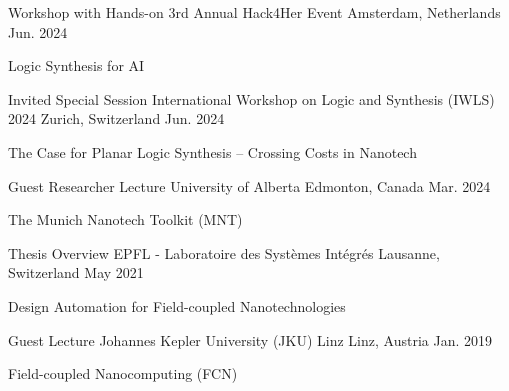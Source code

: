 \begin{cventries}
  \cventry
    {Workshop with Hands-on} %
    {3rd Annual Hack4Her Event} %
    {Amsterdam, Netherlands} %
    {Jun. 2024} %
    {
      \begin{cvitems} %
        \item {Logic Synthesis for AI}
      \end{cvitems}
    }

  \cventry
    {Invited Special Session} %
    {International Workshop on Logic and Synthesis (IWLS) 2024} %
    {Zurich, Switzerland} %
    {Jun. 2024} %
    {
      \begin{cvitems} %
        \item {The Case for Planar Logic Synthesis -- Crossing Costs in Nanotech}
      \end{cvitems}
    }

  \cventry
    {Guest Researcher Lecture} %
    {University of Alberta} %
    {Edmonton, Canada} %
    {Mar. 2024} %
    {
      \begin{cvitems} %
        \item {The Munich Nanotech Toolkit (MNT)}
      \end{cvitems}
    }

  \cventry
    {Thesis Overview} %
    {EPFL - Laboratoire des Systèmes Intégrés} %
    {Lausanne, Switzerland} %
    {May 2021} %
    {
      \begin{cvitems} %
        \item {Design Automation for Field-coupled Nanotechnologies}
      \end{cvitems}
    }

  \cventry
    {Guest Lecture} %
    {Johannes Kepler University (JKU) Linz} %
    {Linz, Austria} %
    {Jan. 2019} %
    {
      \begin{cvitems} %
        \item {Field-coupled Nanocomputing (FCN)}
      \end{cvitems}
    }

\end{cventries}
